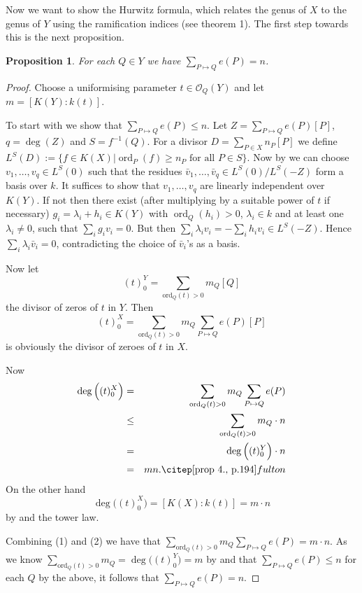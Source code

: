 \documentclass[11pt]{article} %
\newtheorem{prop}{Proposition}
\DeclareMathOperator{\ord}{ord}
\begin{document}
Now we want to show the Hurwitz formula, which relates the genus of $X$ to the genus of $Y$ using the ramification indices (see theorem 1). The first step towards this is the next proposition.\\


\begin{prop}
	For each $Q\in Y$ we have $\sum_{P\mapsto Q}e(P)=n$.
\end{prop}
\begin{proof}
	Choose a uniformising parameter $t\in \mathscr{O}_{Q}(Y)$ and let $m=[K(Y):k(t)]$.

	To start with we show that $\sum_{P\mapsto Q} e(P)\leq n$. Let $Z=\sum_{P\mapsto Q}e(P)[P]$, $q=\deg (Z)$ 
	and $S=f^{-1}(Q)$. For a divisor $D=\sum_{P\in X}n_P[P]$ we define $L^S(D):=\{f\in K(X)|\ord_P(f)\geq n_P\mbox{ for all }P\in S\}$.
	Now by \citep[Lem. 1, pg.193]{fulton} we can choose $v_{1},\ldots,v_{q}\in L^{S}(0)$ such that the residues
	$\bar{v}_{1},\ldots ,\bar{v}_{q}\in L^{S}(0)/L^{S}(-Z)$ form a basis over $k$. It suffices to show that 
	$v_{1},\ldots ,v_{q}$ are linearly independent over $K(Y)$. If not then there exist (after multiplying by a 
	suitable power of $t$ if necessary) $g_{i}=\lambda_{i} +h_{i}\in K(Y)$ with $\ord_{Q}(h_{i})>0$, $\lambda_{i}\in k$ 
	and at least one $\lambda_{i}\neq 0$, such that $\sum_{i}g_{i}v_{i}=0$. But then $\sum_{i}\lambda_{i}v_{i}=-\sum_{i}h_{i}v_{i}\in L^{S}(-Z)$. 
	Hence $\sum_{i}\lambda_{i}\bar{v}_{i}=0$, contradicting the choice of $\bar{v}_{i}$'s as a basis.

	Now let
		\[
			(t)_{0}^{Y}=\sum_{\textrm{ord}_{Q}(t)>0}m_{Q}[Q]
		\]
	 the divisor of zeros of $t$ in $Y$. Then
		\[
			(t)_{0}^{X}=\sum_{\textrm{ord}_{Q}(t)>0}m_{Q} \sum_{P\mapsto Q}e(P)[P]
		\]
	is obviously the divisor of zeroes of $t$ in $X$.

	Now
		\begin{eqnarray}
			\deg\Big((t)_{0}^{X}\Big) & = & \sum_{\textrm{ord}_{Q}(t)>0}m_{Q} \sum_{P\mapsto Q}e(P) \nonumber \\
			& \leq & \sum_{\textrm{ord}_{Q}(t)>0}m_{Q} \cdot n \nonumber \\
			& = & \deg\Big((t)_{0}^{Y}\Big)\cdot n \nonumber \\
			& = & mn. \citep[\mbox{prop 4., p.194}]{fulton}
		\end{eqnarray}
	On the other hand
		\begin{equation}
			\deg\Big((t)_{0}^{X}\Big)=[K(X):k(t)]=m\cdot n
		\end{equation}
	by \citep[prop.4, pg.194]{fulton} and the tower law.
	

	Combining (1) and (2) we have that $\sum_{\textrm{ord}_{Q}(t)>0}m_{Q} \sum_{P\mapsto Q}e(P)=m\cdot n$. As we know $\sum_{\textrm{ord}_{Q}(t)>0}m_{Q}=\deg\Big((t)_{0}^{Y}\Big)=m$ by \citep[prop.4, pg.194]{fulton} and that $\sum_{P\mapsto Q}e(P)\leq n$ for each $Q$ by the above, it follows that $\sum_{P\mapsto Q} e(P)=n$. 
\end{proof}
\end{document}
